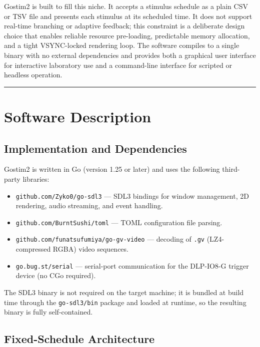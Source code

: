 \documentclass[
  11pt,
]{article}
\providecommand{\tightlist}{%
  \setlength{\itemsep}{0pt}\setlength{\parskip}{0pt}}
\begin{document}
Gostim2 is built to fill this niche. It accepts a stimulus schedule as a
plain CSV or TSV file and presents each stimulus at its scheduled time.
It does not support real-time branching or adaptive feedback; this
constraint is a deliberate design choice that enables reliable resource
pre-loading, predictable memory allocation, and a tight VSYNC-locked
rendering loop. The software compiles to a single binary with no
external dependencies and provides both a graphical user interface for
interactive laboratory use and a command-line interface for scripted or
headless operation.

\begin{center}\rule{0.5\linewidth}{0.5pt}\end{center}

\section{Software Description}\label{software-description}

\subsection{Implementation and
Dependencies}\label{implementation-and-dependencies}

Gostim2 is written in Go (version 1.25 or later) and uses the following
third-party libraries:

\begin{itemize}
\tightlist
\item
  \texttt{github.com/Zyko0/go-sdl3} --- SDL3 bindings for window
  management, 2D rendering, audio streaming, and event handling.
\item
  \texttt{github.com/BurntSushi/toml} --- TOML configuration file
  parsing.
\item
  \texttt{github.com/funatsufumiya/go-gv-video} --- decoding of
  \texttt{.gv} (LZ4-compressed RGBA) video sequences.
\item
  \texttt{go.bug.st/serial} --- serial-port communication for the
  DLP-IO8-G trigger device (no CGo required).
\end{itemize}

The SDL3 binary is not required on the target machine; it is bundled at
build time through the \texttt{go-sdl3/bin} package and loaded at
runtime, so the resulting binary is fully self-contained.

\subsection{Fixed-Schedule
Architecture}\label{fixed-schedule-architecture}
\end{document}
